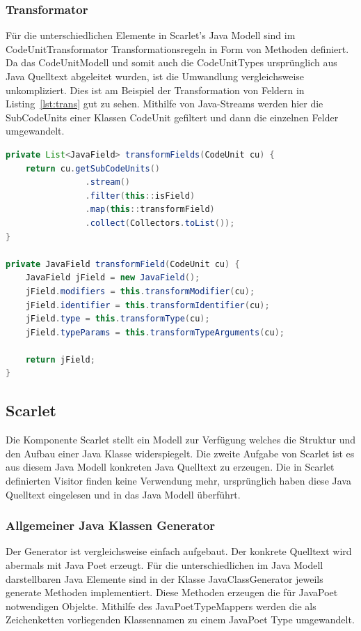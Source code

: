 \documentclass[12pt,oneside,a4paper,parskip]{scrbook}
\begin{document}
\subsubsection{Transformator}

Für die unterschiedlichen Elemente in Scarlet's Java Modell sind im CodeUnitTransformator Transformationsregeln in Form von Methoden definiert. Da das CodeUnitModell und somit auch die CodeUnitTypes ursprünglich aus Java Quelltext abgeleitet wurden, ist die Umwandlung vergleichsweise unkompliziert. Dies ist am Beispiel der Transformation von Feldern in Listing~\ref{lst:trans} gut zu sehen. Mithilfe von Java-Streams werden hier die SubCodeUnits einer Klassen CodeUnit gefiltert und dann die einzelnen Felder umgewandelt.

\begin{lstlisting}[label=lst:trans,
language=java,
firstnumber=1,
caption=Umwandlung der Felder in den SubCodeUnits einer CodeUnit. Auszug aus der Klasse CodeUnitTransformator.]
private List<JavaField> transformFields(CodeUnit cu) {
	return cu.getSubCodeUnits()
				.stream()
				.filter(this::isField)
				.map(this::transformField)
				.collect(Collectors.toList());
}

private JavaField transformField(CodeUnit cu) {
	JavaField jField = new JavaField();
	jField.modifiers = this.transformModifier(cu);
	jField.identifier = this.transformIdentifier(cu);
	jField.type = this.transformType(cu);
	jField.typeParams = this.transformTypeArguments(cu);
	
	return jField;
}
\end{lstlisting}

\subsection{Scarlet}

Die Komponente Scarlet stellt ein Modell zur Verfügung welches die Struktur und den Aufbau einer Java Klasse widerspiegelt. Die zweite Aufgabe von Scarlet ist es aus diesem Java Modell konkreten Java Quelltext zu erzeugen. Die in Scarlet definierten Visitor finden keine Verwendung mehr, ursprünglich haben diese Java Quelltext eingelesen und in das Java Modell überführt.

\subsubsection{Allgemeiner Java Klassen Generator}

Der Generator ist vergleichsweise einfach aufgebaut. Der konkrete Quelltext wird abermals mit Java Poet erzeugt. Für die unterschiedlichen im Java Modell darstellbaren Java Elemente sind in der Klasse JavaClassGenerator jeweils generate Methoden implementiert. Diese Methoden erzeugen die für JavaPoet notwendigen Objekte. Mithilfe des JavaPoetTypeMappers werden die als Zeichenketten vorliegenden Klassennamen zu einem JavaPoet Type umgewandelt.
\end{document}
